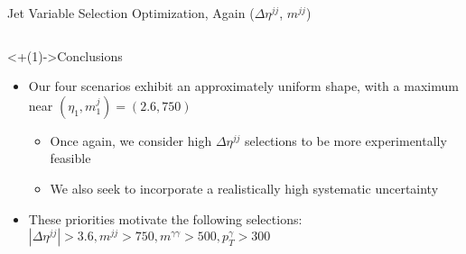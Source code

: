 \documentclass[]{beamer}
\begin{document}
\begin{frame}{Jet Variable Selection Optimization, Again ($\Delta \eta^{jj}$, $m^{jj}$)}
    \begin{columns}
    \end{columns}
    
    \begin{block}<+(1)->{Conclusions}
        \begin{itemize}[<+(1)->]
            \item Our four scenarios exhibit an approximately uniform shape, with a maximum near $(\eta_1, m^j_1) = (2.6, 750)$
            \begin{itemize}[<+(1)->]
                \item Once again, we consider high $\Delta \eta^{jj}$ selections to be more experimentally feasible
                \item We also seek to incorporate a realistically high systematic uncertainty
            \end{itemize}
            \item These priorities motivate the following selections: $|\Delta \eta^{jj}| > 3.6, m^{jj} > 750, m^{\gamma \gamma} > 500, p_T^\gamma > 300$
        \end{itemize}
    \end{block}
\end{frame}
\end{document}
